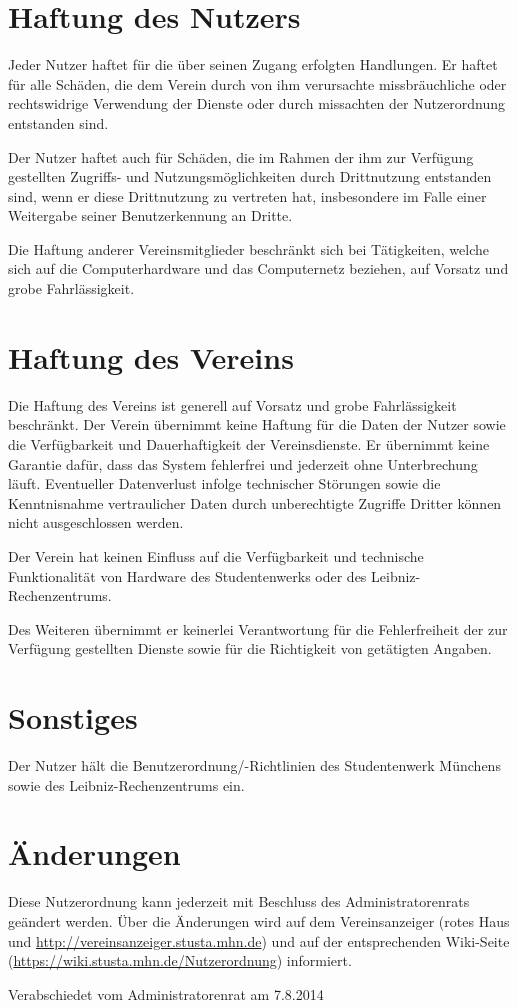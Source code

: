 \documentclass[a4paper,10pt]{scrartcl}
\begin{document}
\section{Haftung des Nutzers}
Jeder Nutzer haftet für die über seinen Zugang erfolgten Handlungen. Er haftet für alle Schäden, die dem Verein durch von ihm verursachte missbräuchliche oder rechtswidrige Verwendung der Dienste oder durch missachten der Nutzerordnung entstanden sind.

Der Nutzer haftet auch für Schäden, die im Rahmen der ihm zur Verfügung gestellten Zugriffs- und Nutzungsmöglichkeiten durch Drittnutzung entstanden sind, wenn er diese Drittnutzung zu vertreten hat, insbesondere im Falle einer Weitergabe seiner Benutzerkennung an Dritte.

Die Haftung anderer Vereinsmitglieder beschränkt sich bei Tätigkeiten, welche sich auf die Computerhardware und das Computernetz beziehen, auf Vorsatz und grobe Fahrlässigkeit.

\section{Haftung des Vereins}
Die Haftung des Vereins ist generell auf Vorsatz und grobe Fahrlässigkeit beschränkt. Der Verein übernimmt keine Haftung für die Daten der Nutzer sowie die Verfügbarkeit und Dauerhaftigkeit der Vereinsdienste. Er übernimmt keine Garantie dafür, dass das System fehlerfrei und jederzeit ohne Unterbrechung läuft. Eventueller Datenverlust infolge technischer Störungen sowie die Kenntnisnahme vertraulicher Daten durch unberechtigte Zugriffe Dritter können nicht ausgeschlossen werden.

Der Verein hat keinen Einfluss auf die Verfügbarkeit und technische Funktionalität von Hardware des Studentenwerks oder des Leibniz-Rechenzentrums.

Des Weiteren übernimmt er keinerlei Verantwortung für die Fehlerfreiheit der zur Verfügung gestellten Dienste sowie für die Richtigkeit von getätigten Angaben.

\section{Sonstiges}
Der Nutzer hält die Benutzerordnung/-Richtlinien des Studentenwerk Münchens sowie des Leibniz-Rechenzentrums ein.

\section{Änderungen}
Diese Nutzerordnung kann jederzeit mit Beschluss des Administratorenrats geändert werden. Über die Änderungen wird auf dem Vereinsanzeiger (rotes Haus und \url{http://vereinsanzeiger.stusta.mhn.de}) und auf der entsprechenden Wiki-Seite (\url{https://wiki.stusta.mhn.de/Nutzerordnung}) informiert. 

\hfill Verabschiedet vom Administratorenrat am 7.8.2014
\end{document}
